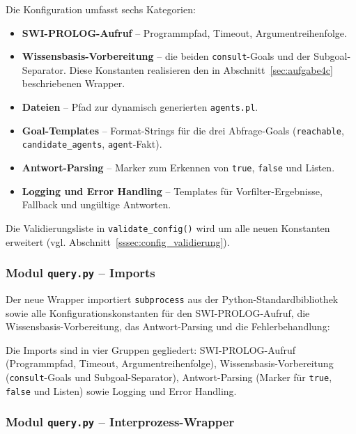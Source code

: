 Die Konfiguration umfasst sechs Kategorien:
\begin{itemize}
    \item \textbf{\acs{SWI}-\acs{PROLOG}-Aufruf} -- Programmpfad, Timeout, Argumentreihenfolge.
    \item \textbf{Wissensbasis-Vorbereitung} -- die beiden \texttt{consult}-Goals und der Subgoal-Separator. Diese Konstanten realisieren den in Abschnitt~\ref{sec:aufgabe4c} beschriebenen Wrapper.
    \item \textbf{Dateien} -- Pfad zur dynamisch generierten \texttt{agents.pl}.
    \item \textbf{Goal-Templates} -- Format-Strings für die drei Abfrage-Goals (\texttt{reachable}, \texttt{candidate\_agents}, \texttt{agent}-Fakt).
    \item \textbf{Antwort-Parsing} -- Marker zum Erkennen von \texttt{true}, \texttt{false} und Listen.
    \item \textbf{Logging und Error Handling} -- Templates für Vorfilter-Ergebnisse, Fallback und ungültige Antworten.
\end{itemize}

Die Validierungsliste in \texttt{validate\_config()} wird um alle neuen Konstanten erweitert (vgl. Abschnitt~\ref{sssec:config_validierung}).


\subsubsection{Modul \texttt{query.py} – Imports}

Der neue Wrapper importiert \texttt{subprocess} aus der Python-Standardbibliothek sowie alle Konfigurationskonstanten für den \acs{SWI}-\acs{PROLOG}-Aufruf, die Wissensbasis-Vorbereitung, das Antwort-Parsing und die Fehlerbehandlung:



Die Imports sind in vier Gruppen gegliedert: \acs{SWI}-\acs{PROLOG}-Aufruf (Programmpfad, Timeout, Argumentreihenfolge), Wissensbasis-Vorbereitung (\texttt{consult}-Goals und Subgoal-Separator), Antwort-Parsing (Marker für \texttt{true}, \texttt{false} und Listen) sowie Logging und Error Handling.

\subsubsection{Modul \texttt{query.py} – Interprozess-Wrapper}

